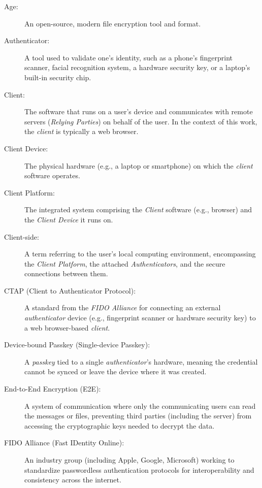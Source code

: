 \label{app:terms}

\begin{description}

\item[Age:] An open-source, modern file encryption tool and format.

\item[Authenticator:] A tool used to validate one’s identity, such as a phone's fingerprint scanner, facial recognition system, a hardware security key, or a laptop's built-in security chip.

\item[Client:] The software that runs on a user’s device and communicates with remote servers (\textit{Relying Parties}) on behalf of the user. In the context of this work, the \textit{client} is typically a web browser.

\item[Client Device:] The physical hardware (e.g., a laptop or smartphone) on which the \textit{client} software operates.

\item[Client Platform:] The integrated system comprising the \textit{Client} software (e.g., browser) and the \textit{Client Device} it runs on.

\item[Client-side:] A term referring to the user's local computing environment, encompassing the \textit{Client Platform}, the attached \textit{Authenticators}, and the secure connections between them.

\item[CTAP (Client to Authenticator Protocol):] A standard from the \textit{FIDO Alliance} for connecting an external \textit{authenticator} device (e.g., fingerprint scanner or hardware security key) to a web browser-based \textit{client}.

\item[Device-bound Passkey (Single-device Passkey):] A \textit{passkey} tied to a single \textit{authenticator}'s hardware, meaning the credential cannot be synced or leave the device where it was created. 

\item[End-to-End Encryption (E2E):] A system of communication where only the communicating users can read the messages or files, preventing third parties (including the server) from accessing the cryptographic keys needed to decrypt the data. 

\item[FIDO Alliance (Fast IDentity Online):] An industry group (including Apple, Google, Microsoft) working to standardize passwordless authentication protocols for interoperability and consistency across the internet. 


\end{description}
